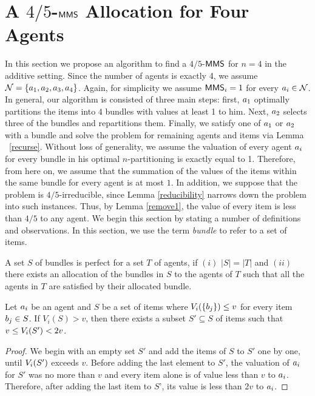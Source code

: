 \section{A $4/5$-$\mathsf{MMS}$ Allocation for Four Agents}\label{45}
In this section we propose an algorithm to find a $4/5$-$\mathsf{MMS}$ for $n=4$ in the additive setting. Since the number of agents is exactly 4, we assume $\mathcal{N} = \{a_1, a_2, a_3, a_4\}$. Again, for simplicity we assume $\mathsf{MMS}_i = 1$ for every $a_i \in \mathcal{N}$. In general, our algorithm is consisted of  three main steps: first, $a_1$ optimally partitions the items into $4$ bundles with values at least 1 to him. Next, $a_2$ selects three of the bundles and repartitions them. Finally, we satisfy one of $a_1$ or $a_2$ with a bundle and solve the problem for remaining agents and items via Lemma ~\ref{recurse}. Without loss of generality, we assume the valuation of every agent $a_i$ for every bundle in his optimal $n$-partitioning is exactly equal to 1. Therefore, from here on, we assume that the summation of the values of the items within the same bundle for every agent is at most $1$. In addition, we suppose that the problem is $4/5$-irreducible, since Lemma \ref{reducibility} narrows down the problem into such instances. Thus, by Lemma \ref{remove1}, the value of every item is less than $4/5$ to any agent. 
We begin this section by stating a number of definitions and observations. In this section, we use the term \emph{bundle} to refer to a set of items.
\begin{definition}
\label{perfect}
A set $S$ of bundles is perfect for a set $T$ of agents, if $(i)$ $|S| = |T|$ and $(ii)$ there exists an allocation of the bundles in $S$ to the agents of $T$ such that all the agents in $T$ are satisfied by their allocated bundle.
\end{definition}



\begin{observation}\label{firstobs}
\label{sum}
Let $a_i$ be an agent and $S$ be a set of items where $V_i(\{b_j\}) \leq v$ for every item $b_j \in S$. If $V_i(S) > v$, then there exists a subset $S' \subseteq S$ of items such that $ v \leq V_i(S') < 2v$.
\end{observation}
\begin{proof}
We begin with an empty set $S'$ and add the items of $S$ to $S'$ one by one, until $V_i(S')$ exceeds $v$. Before adding the last element to $S'$, the valuation of $a_i$ for $S'$ was no more than $v$ and every item alone is of value less than $v$ to $a_i$. Therefore, after adding the last item to $S’$, its value is less than $2v$ to $a_i$.
\end{proof}

